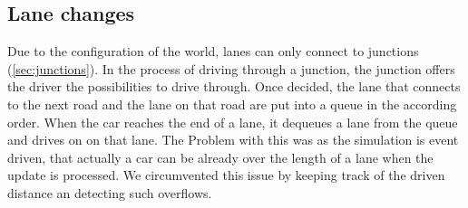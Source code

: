 \subsection{Lane changes}
\label{sec:laneChanges}

Due to the configuration of the world, lanes can only connect to junctions
(\ref{sec:junctions}). In the process of driving through a junction, the 
junction offers the driver the possibilities to drive through. Once decided,
the lane that connects to the next road and the lane on that road are put 
into a queue in the according order. When the car reaches the end of a lane, 
it dequeues a lane from the queue and drives on on that lane. The Problem 
with this was as the simulation is event driven, that actually a car can be 
already over the length of a lane when the update is processed. We circumvented 
this issue by keeping track of the driven distance an detecting such 
overflows.

